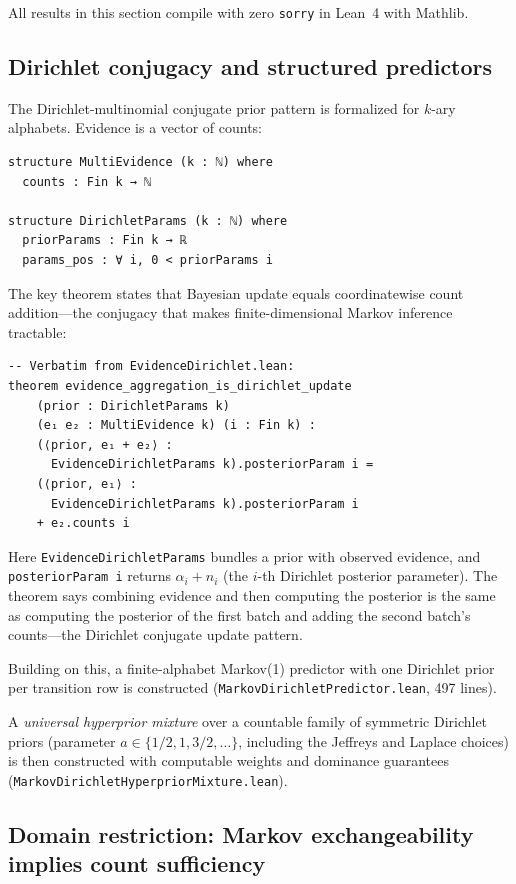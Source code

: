 \documentclass[11pt]{article}
\theoremstyle{definition}
\newcommand{\lean}[1]{\texttt{#1}}
\begin{document}
All results in this section compile with zero \texttt{sorry} in Lean~4
with Mathlib.

\subsection{Dirichlet conjugacy and structured predictors}

The Dirichlet-multinomial conjugate prior pattern is formalized for
$k$-ary alphabets.  Evidence is a vector of counts:

\begin{lstlisting}
structure MultiEvidence (k : ℕ) where
  counts : Fin k → ℕ

structure DirichletParams (k : ℕ) where
  priorParams : Fin k → ℝ
  params_pos : ∀ i, 0 < priorParams i
\end{lstlisting}

The key theorem states that Bayesian update equals coordinatewise count
addition---the conjugacy that makes finite-dimensional Markov inference
tractable:

\begin{lstlisting}
-- Verbatim from EvidenceDirichlet.lean:
theorem evidence_aggregation_is_dirichlet_update
    (prior : DirichletParams k)
    (e₁ e₂ : MultiEvidence k) (i : Fin k) :
    (⟨prior, e₁ + e₂⟩ :
      EvidenceDirichletParams k).posteriorParam i =
    (⟨prior, e₁⟩ :
      EvidenceDirichletParams k).posteriorParam i
    + e₂.counts i
\end{lstlisting}

Here \lean{EvidenceDirichletParams} bundles a prior with observed evidence,
and \lean{posteriorParam i} returns $\alpha_i + n_i$ (the $i$-th Dirichlet
posterior parameter).  The theorem says combining evidence and then computing
the posterior is the same as computing the posterior of the first batch and
adding the second batch's counts---the Dirichlet conjugate update pattern.

Building on this, a finite-alphabet Markov(1) predictor with one
Dirichlet prior per transition row is constructed
(\lean{MarkovDirichletPredictor.lean}, 497 lines).

A \emph{universal hyperprior mixture} over a countable family of symmetric
Dirichlet priors (parameter $a \in \{1/2, 1, 3/2, \ldots\}$, including the
Jeffreys and Laplace choices) is then constructed with computable weights
and dominance guarantees
(\lean{MarkovDirichletHyperpriorMixture.lean}).

\subsection{Domain restriction: Markov exchangeability implies count sufficiency}
\end{document}
